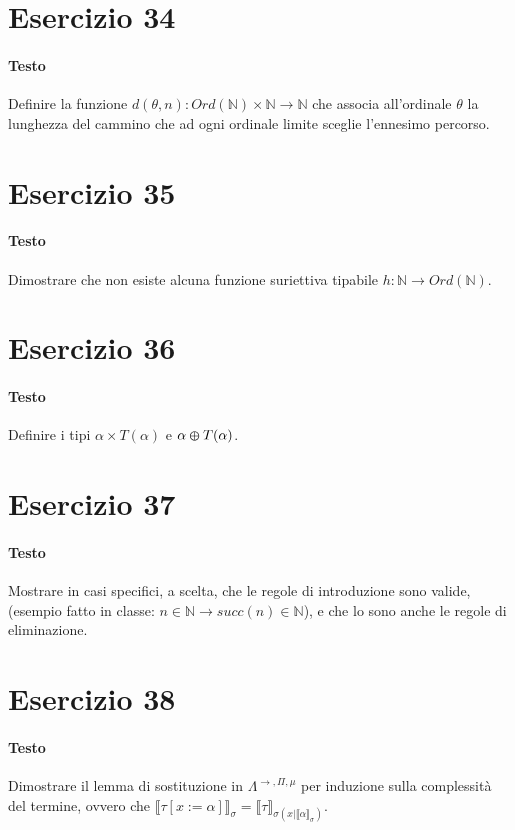\documentclass[a4paper,10pt]{article}
\begin{document}
\section*{Esercizio 34}
\paragraph{Testo}
Definire la funzione $d(\theta, n) : Ord(\mathbb{N}) \times \mathbb{N} \rightarrow \mathbb{N}$ che associa all’ordinale $\theta$ la lunghezza del cammino che ad ogni ordinale limite sceglie l’ennesimo percorso.

\section*{Esercizio 35}
\paragraph{Testo}
Dimostrare che non esiste alcuna funzione suriettiva tipabile $h : \mathbb{N} \rightarrow Ord(\mathbb{N})$.

\section*{Esercizio 36}
\paragraph{Testo}
Definire i tipi $\alpha \times T(\alpha)$ e $\alpha \varoplus T(\alpha)$.

\section*{Esercizio 37}
\paragraph{Testo}
Mostrare in casi specifici, a scelta, che le regole di introduzione sono valide, (esempio fatto in classe: $n \in \mathbb{N} \rightarrow succ(n) \in \mathbb{N}$), e che lo sono anche le regole di eliminazione.

\section*{Esercizio 38}
\paragraph{Testo}
Dimostrare il lemma di sostituzione in $\Lambda^{\rightarrow, \Pi, \mu}$ per induzione sulla complessità del termine, ovvero che $\llbracket \tau [x := \alpha]\rrbracket_\sigma = \llbracket \tau \rrbracket_{\sigma(x|\llbracket \alpha \rrbracket_\sigma)}$.
\end{document}
